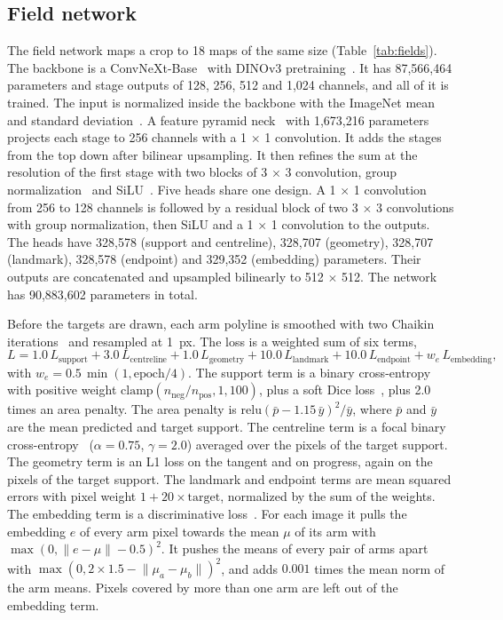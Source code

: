 \subsection*{Field network}

The field network maps a crop to 18 maps of the same size (Table~\ref{tab:fields}).
The backbone is a ConvNeXt-Base~\cite{liu2022convnet} with DINOv3 pretraining~\cite{simeoni2025dinov3}.
It has 87,566,464 parameters and stage outputs of 128, 256, 512 and 1,024 channels, and all of it is trained.
The input is normalized inside the backbone with the ImageNet mean and standard deviation~\cite{deng2009imagenet}.
A feature pyramid neck~\cite{lin2017feature} with 1,673,216 parameters projects each stage to 256 channels with a 1 $\times$ 1 convolution.
It adds the stages from the top down after bilinear upsampling.
It then refines the sum at the resolution of the first stage with two blocks of 3 $\times$ 3 convolution, group normalization~\cite{wu2018group} and SiLU~\cite{elfwing2018sigmoid}.
Five heads share one design.
A 1 $\times$ 1 convolution from 256 to 128 channels is followed by a residual block of two 3 $\times$ 3 convolutions with group normalization, then SiLU and a 1 $\times$ 1 convolution to the outputs.
The heads have 328,578 (support and centreline), 328,707 (geometry), 328,707 (landmark), 328,578 (endpoint) and 329,352 (embedding) parameters.
Their outputs are concatenated and upsampled bilinearly to 512 $\times$ 512.
The network has 90,883,602 parameters in total.

Before the targets are drawn, each arm polyline is smoothed with two Chaikin iterations~\cite{chaikin1974algorithm} and resampled at 1~px.
The loss is a weighted sum of six terms,
\begin{equation}
L = 1.0\,L_{\mathrm{support}} + 3.0\,L_{\mathrm{centreline}} + 1.0\,L_{\mathrm{geometry}} + 10.0\,L_{\mathrm{landmark}} + 10.0\,L_{\mathrm{endpoint}} + w_e\,L_{\mathrm{embedding}},
\label{eq:s1loss}
\end{equation}
with $w_e = 0.5\,\min(1, \mathrm{epoch}/4)$.
The support term is a binary cross-entropy with positive weight $\mathrm{clamp}(n_{\mathrm{neg}}/n_{\mathrm{pos}}, 1, 100)$, plus a soft Dice loss~\cite{milletari2016vnet}, plus 2.0 times an area penalty.
The area penalty is $\mathrm{relu}(\bar{p} - 1.15\,\bar{y})^2/\bar{y}$, where $\bar{p}$ and $\bar{y}$ are the mean predicted and target support.
The centreline term is a focal binary cross-entropy~\cite{lin2017focal} ($\alpha = 0.75$, $\gamma = 2.0$) averaged over the pixels of the target support.
The geometry term is an L1 loss on the tangent and on progress, again on the pixels of the target support.
The landmark and endpoint terms are mean squared errors with pixel weight $1 + 20 \times \mathrm{target}$, normalized by the sum of the weights.
The embedding term is a discriminative loss~\cite{debrabandere2017semantic}.
For each image it pulls the embedding $e$ of every arm pixel towards the mean $\mu$ of its arm with $\max(0, \lVert e - \mu\rVert - 0.5)^2$.
It pushes the means of every pair of arms apart with $\max(0, 2 \times 1.5 - \lVert \mu_a - \mu_b\rVert)^2$, and adds $0.001$ times the mean norm of the arm means.
Pixels covered by more than one arm are left out of the embedding term.

